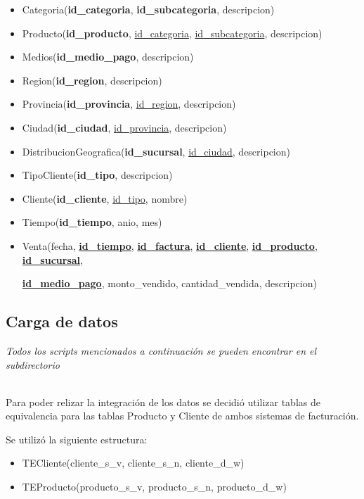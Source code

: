 \begin{itemize}
    \item Categoria(\textbf{id\_categoria}, \textbf{id\_subcategoria}, descripcion)
    \item Producto(\textbf{id\_producto}, \underline{id\_categoria}, \underline{id\_subcategoria}, descripcion)
    \item Medios(\textbf{id\_medio\_pago}, descripcion)
    \item Region(\textbf{id\_region}, descripcion)
    \item Provincia(\textbf{id\_provincia}, \underline{id\_region}, descripcion)
    \item Ciudad(\textbf{id\_ciudad}, \underline{id\_provincia}, descripcion)
    \item DistribucionGeografica(\textbf{id\_sucursal}, \underline{id\_ciudad}, descripcion)
    \item TipoCliente(\textbf{id\_tipo}, descripcion)
    \item Cliente(\textbf{id\_cliente}, \underline{id\_tipo}, nombre)
    \item Tiempo(\textbf{id\_tiempo}, anio, mes)
    \item Venta(fecha, \underline{\textbf{id\_tiempo}}, \underline{\textbf{id\_factura}}, \underline{\textbf{id\_cliente}}, \underline{\textbf{id\_producto}}, \underline{\textbf{id\_sucursal}}, 
        
        \underline{\textbf{id\_medio\_pago}}, monto\_vendido, cantidad\_vendida, descripcion)
\end{itemize}

\subsection{Carga de datos}

\emph{Todos los \emph{scripts} mencionados a continuación se pueden encontrar en el subdirectorio }

~\\

Para poder relizar la integración de los datos se decidió utilizar tablas de equivalencia para las tablas Producto y Cliente de ambos sistemas de facturación.

Se utilizó la siguiente estructura:

\begin{itemize}
    \item TECliente(cliente\_s\_v, cliente\_s\_n, cliente\_d\_w)
    \item TEProducto(producto\_s\_v, producto\_s\_n, producto\_d\_w)
\end{itemize}

